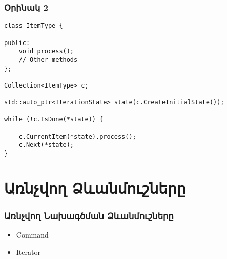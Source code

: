 \documentclass{beamer}
\begin{document}
\begin{frame}[fragile]\frametitle{Օրինակ 2}
\begin{english}
\begin{verbatim}
class ItemType {

public:
    void process();
    // Other methods
};

Collection<ItemType> c;

std::auto_ptr<IterationState> state(c.CreateInitialState());

while (!c.IsDone(*state)) {

    c.CurrentItem(*state).process();
    c.Next(*state);
}
\end{verbatim}
\end{english}
\end{frame}

\section{Առնչվող Ձևանմուշները}
\begin{frame}\frametitle{Առնչվող Նախագծման Ձևանմուշները}
\begin{itemize}
    \item Command \vfill
    \item Iterator
\end{itemize}
\end{frame}
\end{document}
